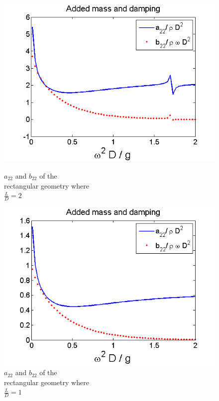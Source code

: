 \documentclass[a4paper,10pt]{article}
\begin{document}
\begin{figure}[!htb]
  \includegraphics[width=\linewidth]{ad_mass_box1.png}
  \caption{$a_{22}$ and $b_{22}$ of the\\ rectangular geometry where\\ $\frac{L}{D}=2$}\label{add_mass_box1}
\endminipage
{}
  \includegraphics[width=\linewidth]{ad_mass_box2.png}
  \caption{$a_{22}$ and $b_{22}$ of the\\ rectangular geometry where\\ $\frac{L}{D}=1$}\label{add_mass_box2}
\endminipage
{}%

\end{figure}
\end{document}
